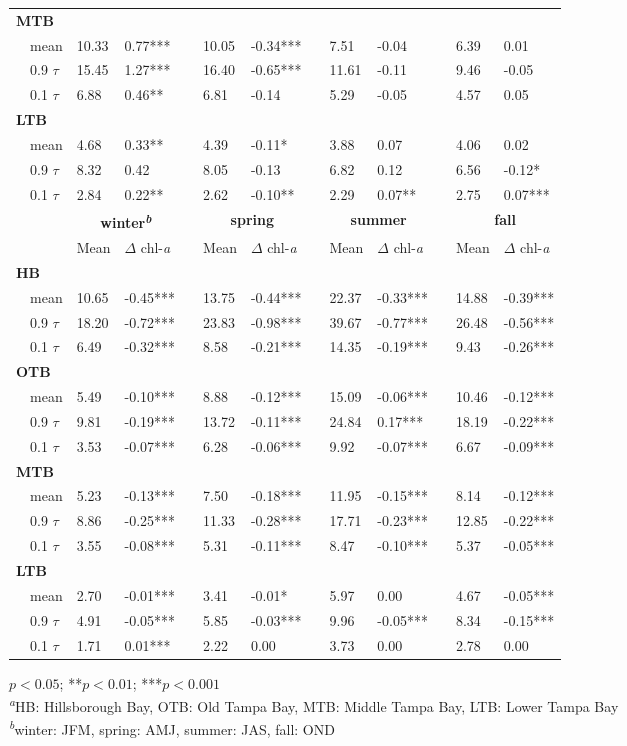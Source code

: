 \documentclass{svjour3}\usepackage[]{graphicx}\usepackage[]{color}
\begin{document}
\begin{table}[!tbp]
\begin{center}
\begin{tabular}{lllcllcllcll}
\hline
{\bfseries MTB}&&&&&&&&&&&\tabularnewline
~~mean&10.33& 0.77***&&10.05&-0.34***&& 7.51&-0.04 && 6.39& 0.01 \tabularnewline
~~0.9 $\tau$&15.45& 1.27***&&16.40&-0.65***&&11.61&-0.11 && 9.46&-0.05 \tabularnewline
~~0.1 $\tau$& 6.88& 0.46**&& 6.81&-0.14 && 5.29&-0.05 && 4.57& 0.05 \tabularnewline
\hline
{\bfseries LTB}&&&&&&&&&&&\tabularnewline
~~mean& 4.68& 0.33**&& 4.39&-0.11*&& 3.88& 0.07 && 4.06& 0.02 \tabularnewline
~~0.9 $\tau$& 8.32& 0.42 && 8.05&-0.13 && 6.82& 0.12 && 6.56&-0.12*\tabularnewline
~~0.1 $\tau$& 2.84& 0.22**&& 2.62&-0.10**&& 2.29& 0.07**&& 2.75& 0.07***\tabularnewline
\hline
\multicolumn{1}{l}{\bfseries }&\multicolumn{2}{c}{\bfseries {\bf winter\textsuperscript{\textit{b}}}}&\multicolumn{1}{c}{\bfseries }&\multicolumn{2}{c}{\bfseries {\bf spring}}&\multicolumn{1}{c}{\bfseries }&\multicolumn{2}{c}{\bfseries {\bf summer}}&\multicolumn{1}{c}{\bfseries }&\multicolumn{2}{c}{\bfseries {\bf fall}}\tabularnewline
\cline{2-3} \cline{5-6} \cline{8-9} \cline{11-12}
~~&Mean&$\Delta$ chl-\textit{a}&&Mean&$\Delta$ chl-\textit{a}&&Mean&$\Delta$ chl-\textit{a}&&Mean&$\Delta$ chl-\textit{a}\tabularnewline
\hline
{\bfseries HB}&&&&&&&&&&&\tabularnewline
~~mean&10.65&-0.45***&&13.75&-0.44***&&22.37&-0.33***&&14.88&-0.39***\tabularnewline
~~0.9 $\tau$&18.20&-0.72***&&23.83&-0.98***&&39.67&-0.77***&&26.48&-0.56***\tabularnewline
~~0.1 $\tau$& 6.49&-0.32***&& 8.58&-0.21***&&14.35&-0.19***&& 9.43&-0.26***\tabularnewline
\hline
{\bfseries OTB}&&&&&&&&&&&\tabularnewline
~~mean& 5.49&-0.10***&& 8.88&-0.12***&&15.09&-0.06***&&10.46&-0.12***\tabularnewline
~~0.9 $\tau$& 9.81&-0.19***&&13.72&-0.11***&&24.84& 0.17***&&18.19&-0.22***\tabularnewline
~~0.1 $\tau$& 3.53&-0.07***&& 6.28&-0.06***&& 9.92&-0.07***&& 6.67&-0.09***\tabularnewline
\hline
{\bfseries MTB}&&&&&&&&&&&\tabularnewline
~~mean& 5.23&-0.13***&& 7.50&-0.18***&&11.95&-0.15***&& 8.14&-0.12***\tabularnewline
~~0.9 $\tau$& 8.86&-0.25***&&11.33&-0.28***&&17.71&-0.23***&&12.85&-0.22***\tabularnewline
~~0.1 $\tau$& 3.55&-0.08***&& 5.31&-0.11***&& 8.47&-0.10***&& 5.37&-0.05***\tabularnewline
\hline
{\bfseries LTB}&&&&&&&&&&&\tabularnewline
~~mean& 2.70&-0.01***&& 3.41&-0.01*&& 5.97& 0.00 && 4.67&-0.05***\tabularnewline
~~0.9 $\tau$& 4.91&-0.05***&& 5.85&-0.03***&& 9.96&-0.05***&& 8.34&-0.15***\tabularnewline
~~0.1 $\tau$& 1.71& 0.01***&& 2.22& 0.00 && 3.73& 0.00 && 2.78& 0.00 \tabularnewline
\hline
\end{tabular}
\end{center}
\footnotesize *$p<0.05$; **$p<0.01$; ***$p<0.001$\\\textsuperscript{\textit{a}}HB: Hillsborough Bay, OTB: Old Tampa Bay, MTB: Middle Tampa Bay, LTB: Lower Tampa Bay\\\textsuperscript{\textit{b}}winter: JFM, spring: AMJ, summer: JAS, fall: OND\end{table}
\end{document}
